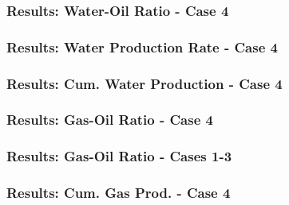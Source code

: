 

\begin{frame}
    \frametitle{Results: Water-Oil Ratio - Case 4}
    \centerline{}
\end{frame}


\begin{frame}
    \frametitle{Results: Water Production Rate - Case 4}
    \centerline{}
\end{frame}

\begin{frame}
    \frametitle{Results: Cum. Water Production - Case 4}
    \centerline{}
\end{frame}


\begin{frame}
    \frametitle{Results: Gas-Oil Ratio - Case 4}
    \centerline{}
\end{frame}

\begin{frame}
    \frametitle{Results: Gas-Oil Ratio - Cases 1-3}
    \centerline{}
\end{frame}

\begin{frame}
    \frametitle{Results: Cum. Gas Prod. - Case 4}
    \centerline{}
\end{frame}


